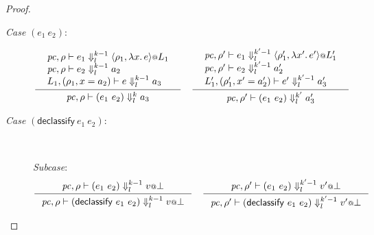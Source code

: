\documentclass{article}
\makeatletter
\theoremstyle{definition}
\newcommand{\at}{\ensuremath{{\scriptstyle{@}}}}
\newcommand{\pc}{\ensuremath{{\mathit{pc}}}}
\makeatother
\begin{document}
\begin{proof}
\begin{description}
  \item[\emph{Case} $(e_1\ e_2)$:]
    \begin{gather*}
      \inference{
        {\begin{array}{l}
            \pc, \rho |- e_1 \Downarrow^{k-1}_{l}
            \langle{\rho_1, \lambda{x}.\, e\rangle} \at L_1
            \\
            \pc, \rho |- e_2 \Downarrow^{k-1}_{l} a_2
            \\
            L_1, (\rho_1, x = a_2) |- e \Downarrow^{k-1}_{l} a_3
          \end{array}}
      }{
        \pc, \rho |- (e_1\ e_2) \Downarrow^{k}_{l} a_3
      }
      \quad
      \inference{
        {\begin{array}{l}
            \pc, \rho' |- e_1 \Downarrow^{k'-1}_{l}
            \langle{\rho_1', \lambda{x'}.\, e'\rangle} \at L_1'
            \\
            \pc, \rho' |- e_2 \Downarrow^{k'-1}_{l} a_2'
            \\
            L_1', (\rho_1', x' = a_2') |- e' \Downarrow^{k'-1}_{l} a_3'
          \end{array}}
      }{
        \pc, \rho' |- (e_1\ e_2) \Downarrow^{k'}_{l} a_3'
      }
    \end{gather*}
    
  \item[\emph{Case} $(\mathsf{declassify}\ e_1\ e_2)$:]\
    
    \emph{Subcase}:
    \begin{gather*}
      \inference{
        \pc, \rho |- (e_1\ e_2) \Downarrow^{k-1}_{l} v \at \bot
      }{
        \pc, \rho |- (\mathsf{declassify}\ e_1\ e_2) \Downarrow^{k-1}_{l}
        v \at \bot
      }
      \quad
      \inference{
        \pc, \rho' |- (e_1\ e_2) \Downarrow^{k'-1}_{l} v' \at \bot
      }{
        \pc, \rho' |- (\mathsf{declassify}\ e_1\ e_2) \Downarrow^{k'-1}_{l}
        v' \at \bot
      }
    \end{gather*}


\end{description}
\end{proof}
\end{document}
